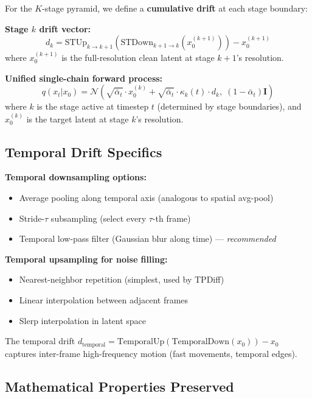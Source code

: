 \documentclass[11pt,a4paper]{article}
\begin{document}
For the $K$-stage pyramid, we define a \textbf{cumulative drift} at each stage boundary:

\textbf{Stage $k$ drift vector:}
\begin{equation}
d_k = \text{STUp}_{k \to k+1}(\text{STDown}_{k+1 \to k}(x_0^{(k+1)})) - x_0^{(k+1)}
\end{equation}
where $x_0^{(k+1)}$ is the full-resolution clean latent at stage $k+1$'s resolution.

\textbf{Unified single-chain forward process:}
\begin{equation}
q(x_t | x_0) = \mathcal{N}\left(\sqrt{\bar\alpha_t} \cdot x_0^{(k)} + \sqrt{\bar\alpha_t} \cdot \kappa_k(t) \cdot d_k, \; (1-\bar\alpha_t)\mathbf{I}\right)
\end{equation}
where $k$ is the stage active at timestep $t$ (determined by stage boundaries), and $x_0^{(k)}$ is the target latent at stage $k$'s resolution.

\subsection{Temporal Drift Specifics}

\textbf{Temporal downsampling options:}
\begin{itemize}[nosep]
\item Average pooling along temporal axis (analogous to spatial avg-pool)
\item Stride-$\tau$ subsampling (select every $\tau$-th frame)
\item Temporal low-pass filter (Gaussian blur along time) --- \emph{recommended}
\end{itemize}

\textbf{Temporal upsampling for noise filling:}
\begin{itemize}[nosep]
\item Nearest-neighbor repetition (simplest, used by TPDiff)
\item Linear interpolation between adjacent frames
\item Slerp interpolation in latent space
\end{itemize}

The temporal drift $d_\text{temporal} = \text{TemporalUp}(\text{TemporalDown}(x_0)) - x_0$ captures inter-frame high-frequency motion (fast movements, temporal edges).

\subsection{Mathematical Properties Preserved}
\end{document}
